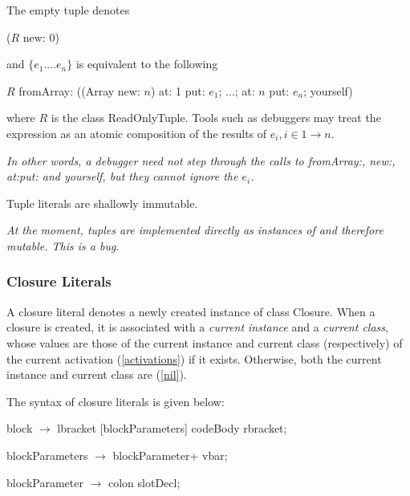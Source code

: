 \documentclass{article}
\newcommand{\code}[1]{{\sf #1}}
\begin{document}
The empty tuple denotes 
\begin{newspeak}
($R$ new: $0$) 
\end{newspeak}

and $\{e_1 . \ldots e_n\}$  is equivalent to the following
\begin{newspeak}
$R$ fromArray: ((Array new: $n$) at: 1 put: $e_1$;  $\ldots$; at: $n$ put: $e_n$; yourself)
\end{newspeak}

where $R$ is the class \code{ReadOnlyTuple}. Tools  such as debuggers may treat the expression as an atomic composition of the results of $e_i, i \in 1 \to n$. 

{\it
In other words, a debugger need not step through the calls to \code{fromArray:}, \code{new:}, \code{at:put:} and \code{yourself}, but they cannot ignore the $e_i$.
}

Tuple literals are shallowly immutable.

{\it 
At the moment, tuples are implemented directly as instances of  and therefore mutable. This is a bug.
}

\subsubsection{ Closure Literals}
\label{block}

A closure literal denotes a newly created instance of class \code{Closure}. When a closure is created, it is associated with a {\em current instance} and a {\em current class}, whose values are those of the current instance and current class (respectively) of the current activation  (\ref{activations}) if it exists. Otherwise, both the current instance and current class are \NIL{} (\ref{nil}). 

The syntax of closure literals is given below: 

\begin{newspeak}
 block $\rightarrow$ lbracket  [blockParameters] codeBody  rbracket;
 
blockParameters $\rightarrow$  blockParameter+ vbar;
 
blockParameter $\rightarrow$ colon slotDecl;                                
\end{newspeak}
\end{document}

